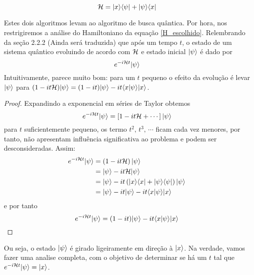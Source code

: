 \begin{equation}
    \mathcal{H} = \vert x \rangle\langle \psi \vert + \vert \psi \rangle\langle x \vert
\end{equation}

Estes dois algoritmos levam ao algoritmo de busca quântica. Por hora, nos restrigiremos a análise do Hamiltoniano da equação \ref{H_escolhido}. Relembrando da seção 2.2.2 (Ainda será traduzida) que após um tempo $t$, o estado de um sistema quântico evoluindo de acordo com $\mathcal{H}$ e estado inicial $\vert \psi \rangle$ é dado por
\begin{equation}
    e^{-i\mathcal{H} t}\vert \psi \rangle
\end{equation}
Intuitivamente, parece muito bom: para um $t$ pequeno o efeito da evolução é levar $\vert \psi \rangle$ para $(1-it\mathcal{H})\vert \psi \rangle=(1-it)\vert \psi \rangle-it\langle x \vert \psi \rangle\vert x \rangle$.
\begin{proof}
    Expandindo a exponencial em séries de Taylor obtemos
    \[
        e^{-i\mathcal{H} t}\vert \psi \rangle = \left[ 1 - it\mathcal{H} + \cdots \right]\vert \psi \rangle
    \] 
    para $t$ suficientemente pequeno, os termo $t^2,\,t^3,\,\cdots$ ficam cada vez menores, por tanto, não apresentam influência significativa ao problema e podem ser desconsideradas. Assim:
    \begin{equation*}
        \begin{split}
            e^{-i\mathcal{H} t}\vert \psi \rangle    &= \left(1 - it\mathcal{H}\right)\vert \psi \rangle\\
                                        &= \vert \psi \rangle -it\mathcal{H}\vert \psi \rangle \\
                                        &= \vert \psi \rangle -it\left(\vert x \rangle\langle x \vert + \vert \psi \rangle\langle \psi \vert\right)\vert \psi \rangle\\
                                        &= \vert \psi \rangle -it\vert \psi \rangle -it\langle x \vert \psi \rangle\vert x \rangle
        \end{split}
    \end{equation*}
    e por tanto
    \begin{equation*}
        e^{-i\mathcal{H} t}\vert \psi \rangle = (1-it)\vert \psi \rangle-it\langle x \vert \psi \rangle\vert x \rangle
    \end{equation*}
\end{proof}

Ou seja, o estado $\vert \psi \rangle$ é girado ligeiramente em direção à $\vert x \rangle$. Na verdade, vamos fazer uma analise completa, com o objetivo de determinar se há um $t$ tal que $e^{-i\mathcal{H} t}\vert \psi \rangle = \vert x \rangle$.